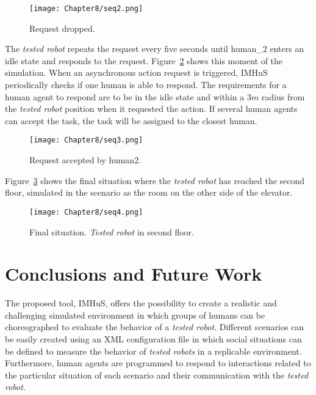 \begin{figure}[!ht]
  \centering
  {\texttt{[image: Chapter8/seq2.png]}}
  \caption{Request dropped.}
  \label{fig:take_elevator_video_2}
\end{figure}

The \textit{tested robot} repeats the request every five seconds until human\_2 enters an idle state and responds to the request. Figure~\ref{fig:take_elevator_video_3} shows this moment of the simulation. When an asynchronous action request is triggered, IMHuS periodically checks if one human is able to respond. The requirements for a human agent to respond are to be in the idle state and within a $3m$ radius from the \textit{tested robot} position when it requested the action. If several human agents can accept the task, the task will be assigned to the closest human.

\begin{figure}[h]
  \centering
  {\texttt{[image: Chapter8/seq3.png]}}\\
  \caption{Request accepted by human2.}
  \label{fig:take_elevator_video_3}
\end{figure}

Figure~\ref{fig:take_elevator_video_4} shows the final situation where the \textit{tested robot} has reached the second floor, simulated in the scenario as the room on the other side of the elevator.

\begin{figure}[h]
  \centering
  {\texttt{[image: Chapter8/seq4.png]}}\\
  \caption{Final situation. \textit{Tested robot} in second floor.}
  \label{fig:take_elevator_video_4}
\end{figure}

\clearpage

\section{Conclusions and Future Work}
\label{sec:conclusions}

The proposed tool, IMHuS, offers the possibility to create a realistic and challenging simulated environment in which groups of humans can be choreographed to evaluate the behavior of a \textit{tested robot}. Different scenarios can be easily created using an XML configuration file in which social situations can be defined to measure the behavior of \textit{tested robots} in a replicable environment. Furthermore, human agents are programmed to respond to interactions related to the particular situation of each scenario and their communication with the \textit{tested robot}. 

